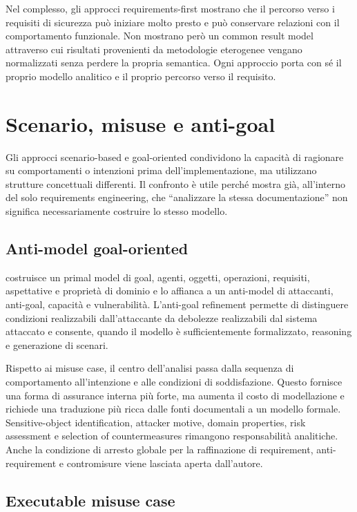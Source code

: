 \documentclass[12pt,a4paper,oneside]{report}
\begin{document}
Nel complesso, gli approcci requirements-first mostrano che il percorso verso i requisiti di sicurezza può iniziare molto presto e può conservare relazioni con il comportamento funzionale. Non mostrano però un common result model attraverso cui risultati provenienti da metodologie eterogenee vengano normalizzati senza perdere la propria semantica. Ogni approccio porta con sé il proprio modello analitico e il proprio percorso verso il requisito.

\section{Scenario, misuse e anti-goal}

Gli approcci scenario-based e goal-oriented condividono la capacità di ragionare su comportamenti o intenzioni prima dell'implementazione, ma utilizzano strutture concettuali differenti. Il confronto è utile perché mostra già, all'interno del solo requirements engineering, che ``analizzare la stessa documentazione'' non significa necessariamente costruire lo stesso modello.

\subsection{Anti-model goal-oriented}

\citet{vanlamsweerde2004elaborating} costruisce un primal model di goal, agenti, oggetti, operazioni, requisiti, aspettative e proprietà di dominio e lo affianca a un anti-model di attaccanti, anti-goal, capacità e vulnerabilità. L'anti-goal refinement permette di distinguere condizioni realizzabili dall'attaccante da debolezze realizzabili dal sistema attaccato e consente, quando il modello è sufficientemente formalizzato, reasoning e generazione di scenari.

Rispetto ai misuse case, il centro dell'analisi passa dalla sequenza di comportamento all'intenzione e alle condizioni di soddisfazione. Questo fornisce una forma di assurance interna più forte, ma aumenta il costo di modellazione e richiede una traduzione più ricca dalle fonti documentali a un modello formale. Sensitive-object identification, attacker motive, domain properties, risk assessment e selection of countermeasures rimangono responsabilità analitiche. Anche la condizione di arresto globale per la raffinazione di requirement, anti-requirement e contromisure viene lasciata aperta dall'autore.

\subsection{Executable misuse case}
\end{document}
